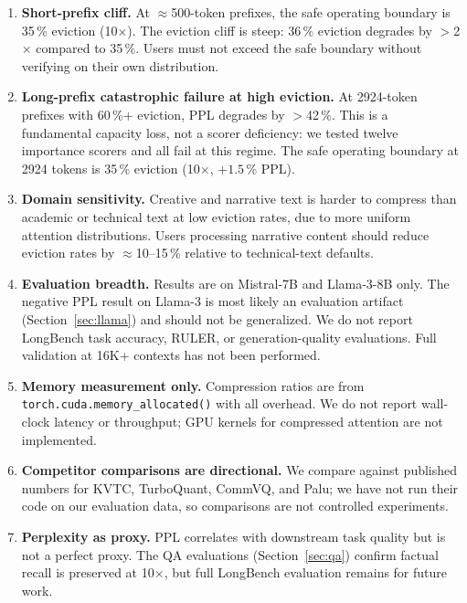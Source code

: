 \documentclass{article}
\begin{document}
\begin{enumerate}
  \item \textbf{Short-prefix cliff.} At $\approx$500-token prefixes, the
    safe operating boundary is 35\,\% eviction (10$\times$). The eviction
    cliff is steep: 36\,\% eviction degrades by $>$2$\times$ compared to
    35\,\%. Users must not exceed the safe boundary without verifying on
    their own distribution.

  \item \textbf{Long-prefix catastrophic failure at high eviction.}
    At 2924-token prefixes with 60\,\%+ eviction, PPL degrades by $>$42\,\%.
    This is a fundamental capacity loss, not a scorer deficiency: we tested
    twelve importance scorers and all fail at this regime. The safe operating
    boundary at 2924 tokens is 35\,\% eviction (10$\times$, $+1.5$\,\% PPL).

  \item \textbf{Domain sensitivity.} Creative and narrative text is harder
    to compress than academic or technical text at low eviction rates, due to
    more uniform attention distributions. Users processing narrative content
    should reduce eviction rates by $\approx$10--15\,\% relative to
    technical-text defaults.

  \item \textbf{Evaluation breadth.} Results are on Mistral-7B and Llama-3-8B
    only. The negative PPL result on Llama-3 is most likely an evaluation
    artifact (Section~\ref{sec:llama}) and should not be generalized. We do
    not report LongBench task accuracy, RULER, or generation-quality evaluations.
    Full validation at 16K+ contexts has not been performed.

  \item \textbf{Memory measurement only.} Compression ratios are from
    \texttt{torch.cuda.memory\_allocated()} with all overhead. We do not
    report wall-clock latency or throughput; GPU kernels for compressed
    attention are not implemented.

  \item \textbf{Competitor comparisons are directional.} We compare against
    published numbers for KVTC, TurboQuant, CommVQ, and Palu; we have not
    run their code on our evaluation data, so comparisons are
    not controlled experiments.

  \item \textbf{Perplexity as proxy.} PPL correlates with downstream task
    quality but is not a perfect proxy. The QA evaluations (Section~\ref{sec:qa})
    confirm factual recall is preserved at 10$\times$, but full LongBench
    evaluation remains for future work.


\end{enumerate}
\end{document}
